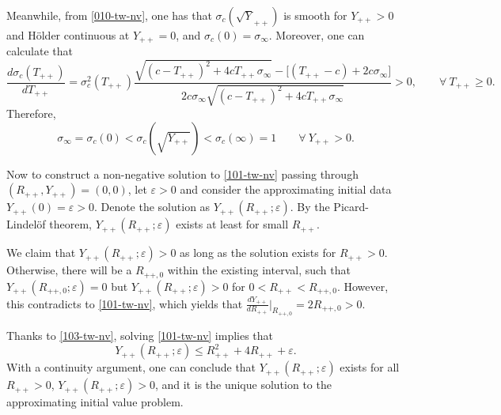 \documentclass[12pt]{article}
\theoremstyle{definition}
\theoremstyle{remark}
\numberwithin{equation}{section}
\begin{document}
Meanwhile, from \eqref{010-tw-nv}, one has that $ \sigma_c (\sqrt Y_{++}) $ is smooth for $ Y_{++} > 0 $ and H\"older continuous at $ Y_{++} = 0 $, and $ \sigma_c (0) = \sigma_\infty $. Moreover, one can calculate that
\begin{equation}
    \label{102-tw-nv}
    \frac{d\sigma_c(T_{++})}{d T_{++}} = \sigma_c^2(T_{++}) \frac{\sqrt{(c-T_{++})^2 + 4c T_{++} \sigma_\infty} - \lbrack (T_{++}-c) + 2c\sigma_\infty\rbrack}{2 c \sigma_\infty \sqrt{(c-T_{++})^2 + 4c T_{++} \sigma_\infty}} > 0, \qquad \forall \ T_{++} \geq 0.
\end{equation}
Therefore, \begin{equation}\label{103-tw-nv} \sigma_\infty = \sigma_c(0) < \sigma_c(\sqrt{Y_{++}}) < \sigma_c(\infty) = 1 \qquad \forall \  Y_{++} > 0. \end{equation}

Now to construct a non-negative solution to \eqref{101-tw-nv} passing through $ (R_{++}, Y_{++}) = (0,0) $, let $ \varepsilon > 0 $ and consider the approximating initial data $ Y_{++}(0) = \varepsilon > 0 $. Denote the solution as $ Y_{++}(R_{++};\varepsilon) $. By the Picard-Lindel\"of theorem, $ Y_{++}(R_{++};\varepsilon) $ exists at least for small $ R_{++} $. 

We claim that $ Y_{++}(R_{++};\varepsilon) >0 $ as long as the solution exists for $ R_{++} > 0 $. Otherwise, there will be a $ R_{++,0} $ within the existing interval, such that $ Y_{++}(R_{++,0};\varepsilon) =0 $ but $ Y_{++}(R_{++};\varepsilon) > 0 $ for $ 0 < R_{++} < R_{++,0} $. However, this contradicts to \eqref{101-tw-nv}, which yields that $ \frac{dY_{++}}{dR_{++}} \vert_{R_{++,0}} = 2 R_{++,0} > 0 $.

Thanks to \eqref{103-tw-nv}, solving \eqref{101-tw-nv} implies that
\begin{equation}
    \label{104-tw-nv}
    Y_{++}(R_{++};\varepsilon) \leq  R_{++}^2 + 4 R_{++} + \varepsilon.
\end{equation}
With a continuity argument, one can conclude that $ Y_{++}(R_{++};\varepsilon) $ exists for all $ R_{++}> 0 $, $ Y_{++}(R_{++};\varepsilon) > 0 $, and it is the unique solution to the approximating initial value problem. 
\end{document}

